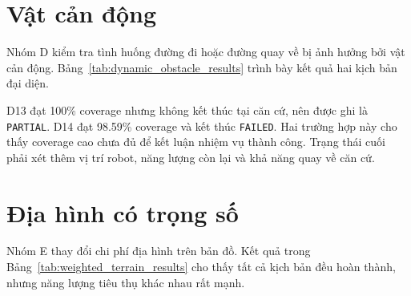 \documentclass[../DoAn.tex]{subfiles}
\begin{document}
\section{Vật cản động}

Nhóm D kiểm tra tình huống đường đi hoặc đường quay về bị ảnh hưởng bởi vật cản động. Bảng~\ref{tab:dynamic_obstacle_results} trình bày kết quả hai kịch bản đại diện.

\begin{table}[H]
\centering
\caption{Kết quả nhóm D với vật cản động}
\label{tab:dynamic_obstacle_results}
\scriptsize
\setlength{\tabcolsep}{3.5pt}
\renewcommand{\arraystretch}{1.08}
\end{table}

D13 đạt 100\% coverage nhưng không kết thúc tại căn cứ, nên được ghi là \texttt{PARTIAL}. D14 đạt 98.59\% coverage và kết thúc \texttt{FAILED}. Hai trường hợp này cho thấy coverage cao chưa đủ để kết luận nhiệm vụ thành công. Trạng thái cuối phải xét thêm vị trí robot, năng lượng còn lại và khả năng quay về căn cứ.

\section{Địa hình có trọng số}

Nhóm E thay đổi chi phí địa hình trên bản đồ. Kết quả trong Bảng~\ref{tab:weighted_terrain_results} cho thấy tất cả kịch bản đều hoàn thành, nhưng năng lượng tiêu thụ khác nhau rất mạnh.
\end{document}
